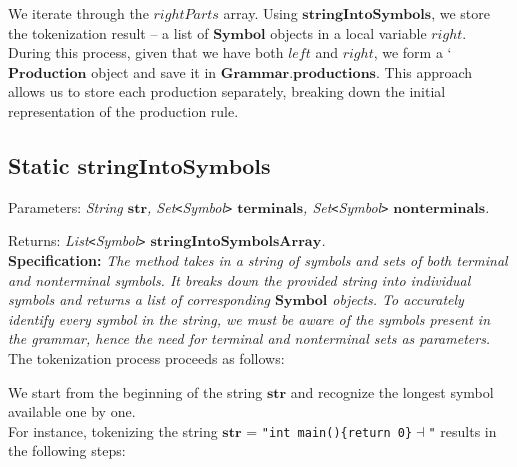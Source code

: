 We iterate through the \(rightParts\) array. Using \(\boldsymbol{stringIntoSymbols}\), we store the tokenization result – a list of \(\boldsymbol{Symbol}\) objects in a local variable \(right\). During this process, given that we have both \(left\) and \(right\), we form a ‘\(\boldsymbol{Production}\) object and save it in \(\boldsymbol{Grammar.productions}\). This approach allows us to store each production separately, breaking down the initial representation of the production rule.

\vspace{30pt}

\subsection{Static \(\boldsymbol{stringIntoSymbols}\)}

Parameters: \textit{String \(\boldsymbol{str}\), Set\texttt{<}Symbol\texttt{>} \(\boldsymbol{terminals}\), Set\texttt{<}Symbol\texttt{>} \(\boldsymbol{nonterminals}\).}

Returns: \textit{ List\texttt{<}Symbol\texttt{>} \(\boldsymbol{stringIntoSymbolsArray}\).}\\

\textbf{Specification:} \textit{The method takes in a string of symbols and sets of both terminal and nonterminal symbols. It breaks down the provided string into individual symbols and returns a list of corresponding \(\boldsymbol{Symbol}\) objects. To accurately identify every symbol in the string, we must be aware of the symbols present in the grammar, hence the need for terminal and nonterminal sets as parameters.}\\

The tokenization process proceeds as follows:

We start from the beginning of the string \(\boldsymbol{str}\) and recognize the longest symbol available one by one.\\

For instance, tokenizing the string \(\boldsymbol{str}\) = \texttt{"int main()\{return 0\}\( \dashv \)"} results in the following steps:

